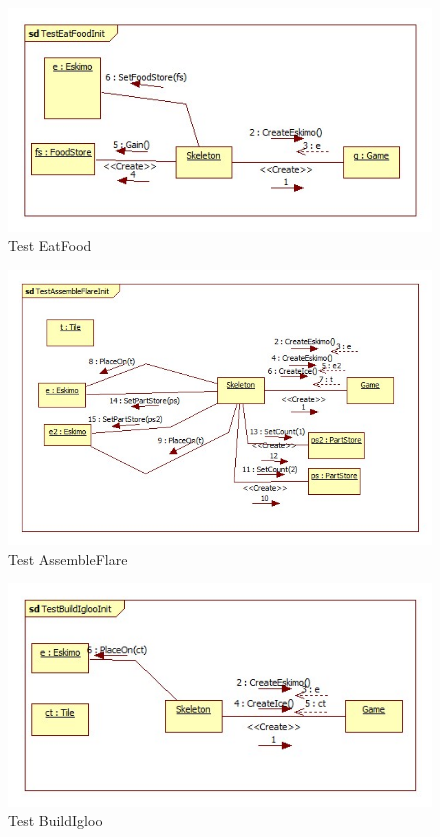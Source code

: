 \begin{figure}[h]
	\begin{center}
		\includegraphics[width=17cm]{chapters/chapter05/diagrams/Test_EatFood_init.jpg}
		\caption{Test EatFood}
		\label{fig:Test EatFood}
	\end{center}
\end{figure}
\begin{figure}[h]
	\begin{center}
		\includegraphics[width=17cm]{chapters/chapter05/diagrams/Test_AssembleFlare_init.jpg}
		\caption{Test AssembleFlare}
		\label{fig:Test AssembleFlare}
	\end{center}
\end{figure}

\begin{figure}[h]
	\begin{center}
		\includegraphics[width=17cm]{chapters/chapter05/diagrams/Test_BuildIgloo_init.jpg}
		\caption{Test BuildIgloo}
		\label{fig:Test BuildIgloo}
	\end{center}
\end{figure}


